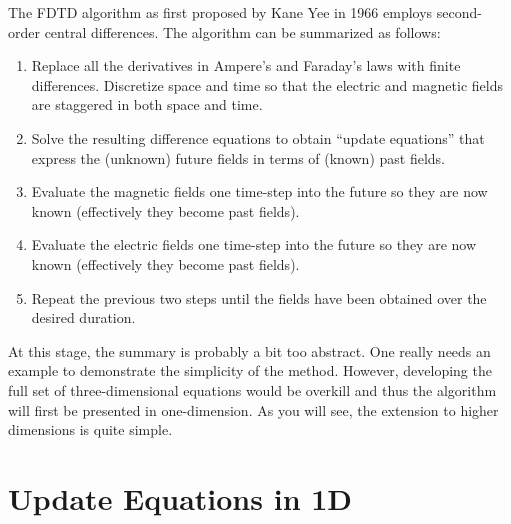 The FDTD algorithm as first proposed by Kane Yee in 1966 employs
second-order central differences.  The algorithm can be summarized as
follows:
\begin{enumerate}
\item Replace all the derivatives in Ampere's and Faraday's laws with
finite differences.  Discretize space and time so that the electric and
magnetic fields are staggered in both space and time.

\item Solve the resulting difference equations to obtain ``update
equations'' that express the (unknown) future fields in terms of
(known) past fields.

\item Evaluate the magnetic fields one time-step into the future so
they are now known (effectively they become past fields).

\item Evaluate the electric fields one time-step into the future so
they are now known (effectively they become past fields). 

\item Repeat the previous two steps until the fields have been
obtained over the desired duration.
\end{enumerate}
At this stage, the summary is probably a bit too abstract.  One really
needs an example to demonstrate the simplicity of the method.
However, developing the full set of three-dimensional equations would
be overkill and thus the algorithm will first be presented in
one-dimension.  As you will see, the extension to higher dimensions is
quite simple.

\section{Update Equations in 1D \label{sec:update}}

